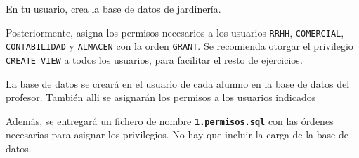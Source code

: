 \begin{homeworkProblem}
  En tu usuario, crea la base de datos de jardinería.

  Posteriormente, asigna los permisos necesarios a los usuarios \texttt{RRHH}, \texttt{COMERCIAL}, \texttt{CONTABILIDAD} y \texttt{ALMACEN} con la orden \texttt{GRANT}.   Se recomienda otorgar el privilegio \texttt{CREATE VIEW} a todos los usuarios, para facilitar el resto de ejercicios.
  
  \begin{Aviso}
    La base de datos se creará en el usuario de cada alumno en la base de datos del profesor. También alli se asignarán los permisos a los usuarios indicados

    Además, se entregará un fichero de nombre \textbf{\texttt{1.permisos.sql}} con las órdenes necesarias para asignar los privilegios. No hay que incluir la carga de la base de datos.
  \end{Aviso}

  
\end{homeworkProblem}




